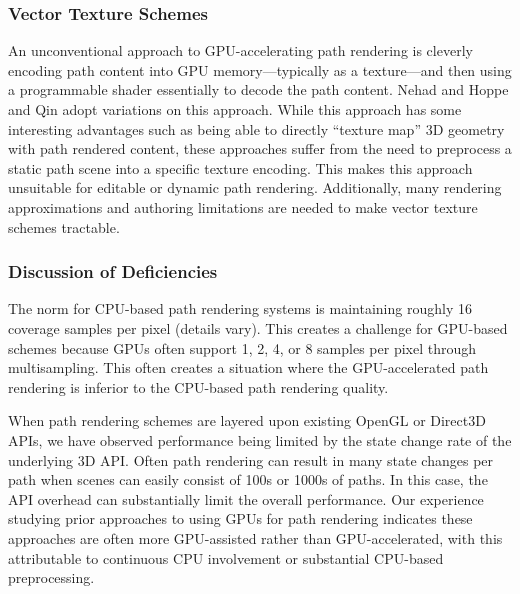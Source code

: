 \subsubsection{Vector Texture Schemes}

An unconventional approach to GPU-accelerating path rendering
is cleverly encoding path content into GPU memory---typically as a
texture---and then using a programmable shader essentially to decode the
path content.  Nehad and Hoppe 
and Qin  adopt variations on this approach.  While this
approach has some interesting advantages such as being able to directly
``texture map'' 3D geometry with path rendered content, these approaches
suffer from the need to preprocess a static path scene into a specific
texture encoding.  This makes this approach unsuitable for editable or
dynamic path rendering.  Additionally, many rendering approximations
and authoring limitations are needed to make vector texture schemes
tractable.

\subsubsection{Discussion of Deficiencies}

The norm for CPU-based path rendering systems is maintaining roughly
16 coverage samples per pixel (details vary).  This creates a challenge
for GPU-based schemes because GPUs often support 1, 2, 4, or 8 samples
per pixel through multisampling.  This often creates a situation where
the GPU-accelerated path rendering is inferior to the CPU-based path
rendering quality.

When path rendering schemes are layered upon existing OpenGL or Direct3D
APIs, we have observed performance being limited by the state change
rate of the underlying 3D API.  Often path rendering can result in
many state changes per path when scenes can easily consist of 100s or
1000s of paths.  In this case, the API overhead can substantially limit
the overall performance.  Our experience studying prior approaches to
using GPUs for path rendering indicates these approaches are often more
GPU-assisted rather than GPU-accelerated, with this attributable to
continuous CPU involvement or substantial CPU-based preprocessing.

